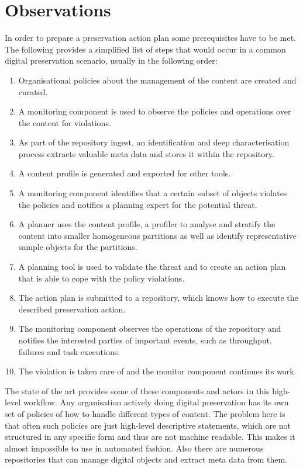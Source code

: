\section{Observations}
In order to prepare a preservation action plan some prerequisites have to be met. The following provides a simplified list of steps that would occur in a common digital preservation scenario, usually in the following order: 
\begin{enumerate}
\item Organisational policies about the management of the content are created and curated.
\item A monitoring component is used to observe the policies and operations over the content for violations.
\item As part of the repository ingest, an identification and deep characterisation process extracts valuable meta data and stores it within the repository.
\item A content profile is generated and exported for other tools.
\item A monitoring component identifies that a certain subset of objects violates the policies and notifies a planning expert for the potential threat.
\item A planner uses the content profile, a profiler to analyse and stratify the content into smaller homogeneous partitions as well as identify representative sample objects for the partitions.
\item A planning tool is used to validate the threat and to create an action plan that is able to cope with the policy violations.
\item The action plan is submitted to a repository, which knows how to execute the described preservation action.
\item The monitoring component observes the operations of the repository and notifies the interested parties of important events, such as throughput, failures and task executions. 
\item The violation is taken care of and the monitor component continues its work.
\end{enumerate}

The state of the art provides some of these components and actors in this high-level workflow. Any organisation actively doing digital preservation has its own set of policies of how to handle different types of content. The problem here is that often such policies are just high-level descriptive statements, which are not structured in any specific form and thus are not machine readable. This makes it almost impossible to use in automated fashion. Also there are numerous repositories that can manage digital objects and extract meta data from them. 

